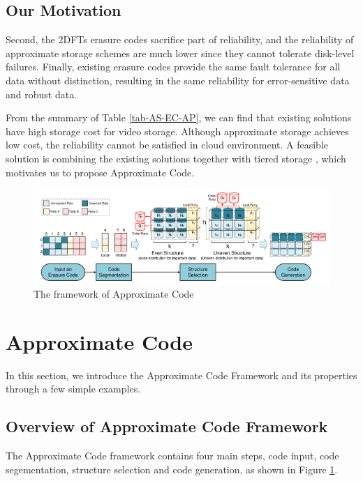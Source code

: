 \documentclass[sigconf]{acmart}
\begin{document}
\subsection{Our Motivation}

Second, the 2DFTs erasure codes sacrifice part of reliability, and the reliability of approximate storage schemes are much lower since they cannot tolerate disk-level failures.
Finally, existing erasure codes provide the same fault tolerance for all data without distinction, resulting in the same reliability for error-sensitive data and robust data.

From the summary of Table \ref{tab-AS-EC-AP}, we can find that existing solutions have high storage cost for video storage. Although approximate storage achieves low cost, the reliability cannot be satisfied in cloud environment. A feasible solution is combining the existing solutions together with tiered storage \cite{krish2014hats} \cite{wang2014balancing} \cite{zhang2010automated} \cite{udipi2012lot}, which motivates us to propose Approximate Code.

\begin{figure}[ht!]
\centering
\includegraphics[width=\linewidth]{photo/Framework-v3.pdf}
\caption{The framework of Approximate Code}
\label{fig-framework}
\end{figure}

\section{Approximate Code}\label{ApCode}
In this section, we introduce the Approximate Code Framework and its properties through a few simple examples.

\subsection{Overview of Approximate Code Framework}
The Approximate Code framework contains four main steps, code input, code segementation, structure selection and code generation, as shown in Figure \ref{fig-framework}.
\end{document}
